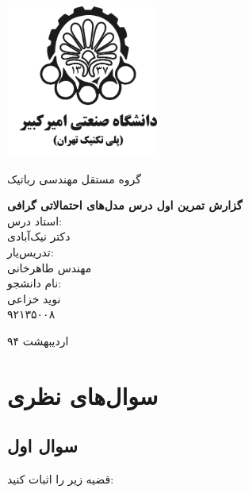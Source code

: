 \documentclass[11.5pt,a4paper]{article}
\newcommand{\nocontentsline}[3]{}
\newcommand{\tocless}[2]{\bgroup\let\addcontentsline=\nocontentsline#1{#2}\egroup}
\begin{document}
\thispagestyle{empty}
\vspace*{-28mm}
\centerline{\includegraphics[height=5cm]{logo.png}}

\begin{center}
\vspace{-2mm}
{\large
گروه مستقل مهندسی رباتیک
\\[2.1cm]
}

{\large
\textbf{گزارش تمرین اول درس مدل‌های احتمالاتی گرافی}
\\[2cm]

استاد درس:
\\[.5cm]
{\Large
دکتر نیک‌آبادی}
\\[1.5cm]
\large 
تدریس‌یار:
\\[.5cm]
{\Large
مهندس طاهرخانی}
\\[1.5cm]

\large 
نام دانشجو:
\\[.5cm]
{\Large
نوید خزاعی}
\\[.5cm]
۹۲۱۳۵۰۰۸
\\[1.5cm]
}

{\large
اردیبهشت ۹۴
}
\end{center}

\newpage
\baselineskip=1cm
\tocless\tableofcontents

\newpage
\baselineskip=0.75cm
\section{سوال‌های نظری}
\subsection{سوال اول}
قضیه زیر را اثبات کنید: 
\begin{latin}
\end{latin}
\end{document}
